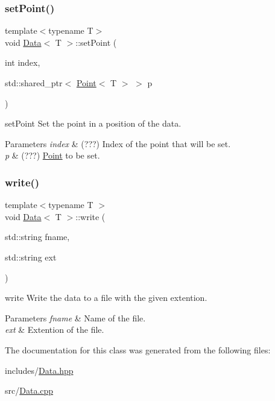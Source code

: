 \subsubsection{\texorpdfstring{set\+Point()}{setPoint()}}
{\footnotesize\ttfamily template$<$typename T$>$ \\
void \hyperlink{class_data}{Data}$<$ T $>$\+::set\+Point (\begin{DoxyParamCaption}\item[{int}]{index,  }\item[{std\+::shared\+\_\+ptr$<$ \hyperlink{class_point}{Point}$<$ T $>$ $>$}]{p }\end{DoxyParamCaption})}



set\+Point Set the point in a position of the data. 


\begin{DoxyParams}{Parameters}
{\em index} & (???) Index of the point that will be set. \\
\hline
{\em p} & (???) \hyperlink{class_point}{Point} to be set. \\
\hline
\end{DoxyParams}
\mbox{\label{class_data_a1f0bf8cc73e43cd6915289706abc46b2}} 
\subsubsection{\texorpdfstring{write()}{write()}}
{\footnotesize\ttfamily template$<$typename T $>$ \\
void \hyperlink{class_data}{Data}$<$ T $>$\+::write (\begin{DoxyParamCaption}\item[{std\+::string}]{fname,  }\item[{std\+::string}]{ext }\end{DoxyParamCaption})}



write Write the data to a file with the given extention. 


\begin{DoxyParams}{Parameters}
{\em fname} & Name of the file. \\
\hline
{\em ext} & Extention of the file. \\
\hline
\end{DoxyParams}


The documentation for this class was generated from the following files\+:\begin{DoxyCompactItemize}
\item 
includes/\hyperlink{_data_8hpp}{Data.\+hpp}\item 
src/\hyperlink{_data_8cpp}{Data.\+cpp}\end{DoxyCompactItemize}
